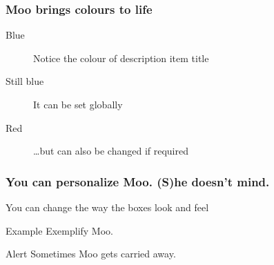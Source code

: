 \documentclass{beamer}
\begin{document}
\begin{frame}
	\frametitle{Moo brings colours to life}
		\begin{description}
			\item [Blue] Notice the colour of description item title
			\item [Still blue] It can be set globally
			\item [\color{red} Red] \dots but can also be changed if required
		\end{description}
\end{frame}	



\begin{frame}
	\frametitle{You can personalize Moo. (S)he doesn't mind.}
	
		\begin{theorem}[It's a theorem]
			You can change the way the boxes look and feel
		\end{theorem}
		
		\begin{exampleblock}{Example}
			Exemplify Moo.
		\end{exampleblock}
		
		\begin{alertblock}{Alert}
			Sometimes Moo gets carried away.
		\end{alertblock}
\end{frame}	
\end{document}
